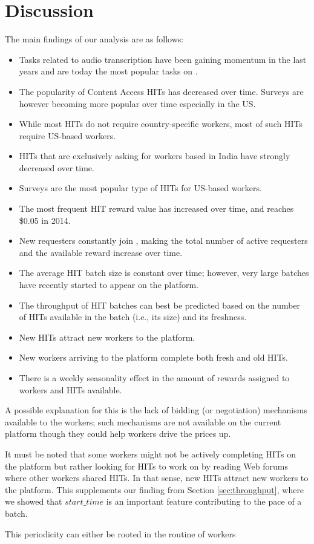 \section{Discussion}
\label{sec:discuss}

The main findings of our analysis are as follows:
\begin{itemize}[noitemsep,topsep=0pt,parsep=0pt,partopsep=0pt]
	\item Tasks related to audio transcription have been gaining momentum in the last years and are today the most popular tasks on \amt{}.
	\item The popularity of Content Access HITs has decreased over time. Surveys are however becoming more popular over time especially in the US.
	\item While most HITs do not require country-specific workers, most of such HITs require US-based workers.
	\item HITs that are exclusively asking for workers based in India have strongly decreased over time.
	\item Surveys are the most popular type of HITs for US-based workers.
	\item The most frequent HIT reward value has increased over time, and reaches \$0.05 in 2014.
	\item New requesters constantly join \amt{}, making the total number of active requesters and the available reward increase over time.
	\item The average HIT batch size is constant over time; however, very large batches have recently started to appear on the platform.
	\item The throughput of HIT batches can best be predicted based on the number of HITs available in the batch (i.e., its size) and its freshness.
	\item New HITs attract new workers to the platform.
	\item New workers arriving to the platform complete both fresh and old HITs.
	\item There is a weekly seasonality effect in the amount of rewards assigned to workers and HITs available.
\end{itemize}


A possible explanation for this is the lack of bidding (or negotiation) mechanisms available to the workers; such mechanisms are not available on the current platform though they could help workers drive the prices up. 

It must be noted that some workers might not be actively completing HITs on the platform but rather looking for HITs to work on by reading Web forums where other workers shared HITs. In that sense, new HITs attract new workers to the platform. This supplements our finding from Section \ref{sec:throughput}, where we showed that $start\_time$ is an important feature contributing to the pace of a batch.


This periodicity can either be rooted in the routine of workers